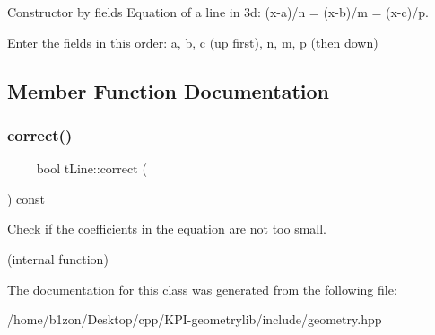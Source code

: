 Constructor by fields  Equation of a line in 3d\+: (x-\/a)/n = (x-\/b)/m = (x-\/c)/p. 

Enter the fields in this order\+: a, b, c (up first), n, m, p (then down) 

\subsection{Member Function Documentation}
\mbox{\label{classtLine_a11c37f0cbc668b30ebce655e7de4eb54}} 
\subsubsection{\texorpdfstring{correct()}{correct()}}
{\footnotesize\ttfamily      bool t\+Line\+::correct (\begin{DoxyParamCaption}{ }\end{DoxyParamCaption}) const}



Check if the coefficients in the equation are not too small. 

(internal function) 

The documentation for this class was generated from the following file\+:\begin{DoxyCompactItemize}
\item 
/home/b1zon/\+Desktop/cpp/\+K\+P\+I-\/geometrylib/include/geometry.\+hpp\end{DoxyCompactItemize}

